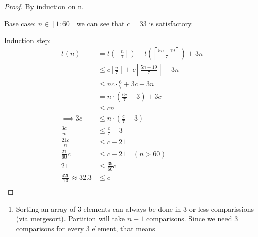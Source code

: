 \documentclass{article}
\begin{document}
\begin{tasks}
{\begin{enumerate}[label={(\arabic*)}]
{                    \begin{proof}
                        By induction on n.

                        Base case: \(n \in [1:60]\) we can see that \(c = 33\) is satisfactory.
                        
                        Induction step:
                        \begin{displaymath}
                            \begin{aligned}
                                t(n)
                                &= t\left(\left\lfloor\frac{n}{7}\right\rfloor\right) + t\left(\left\lceil\frac{5n+19}{7}\right\rceil\right) + 3n \\
                                &\leq c\left\lfloor\frac{n}{7}\right\rfloor + c\left\lceil\frac{5n+19}{7}\right\rceil + 3n\\
                                &\leq nc\cdot\frac{6}{7} + 3c + 3n \\
                                &= n\cdot\left(\frac{6c}{7}+3\right) + 3c \\
                                &\leq cn \\ \implies
                                3c &\leq n\cdot\left(\frac{c}{7}-3\right) \\
                                \frac{3c}{n} &\leq \frac{c}{7}-3 \\
                                \frac{21c}{n} &\leq c-21 \\
                                \frac{21}{60}c &\leq c-21 \quad (n > 60) \\
                                21 &\leq \frac{39}{60}c \\
                                \frac{420}{13} \approx 32.3 &\leq c \\
                            \end{aligned}
                        \end{displaymath}
                    \end{proof}
                }
            \end{enumerate}
        }
        \item {
            \begin{enumerate}[label={(\arabic*)}]
                \item {
                    Sorting an array of 3 elements can always be done in 3 or less comparissions (via mergesort).
                    Partition will take \(n-1\) comparisons. Since we need 3 comparisons for every 3 element, that means
}
\end{enumerate}}
\end{tasks}
\end{document}
